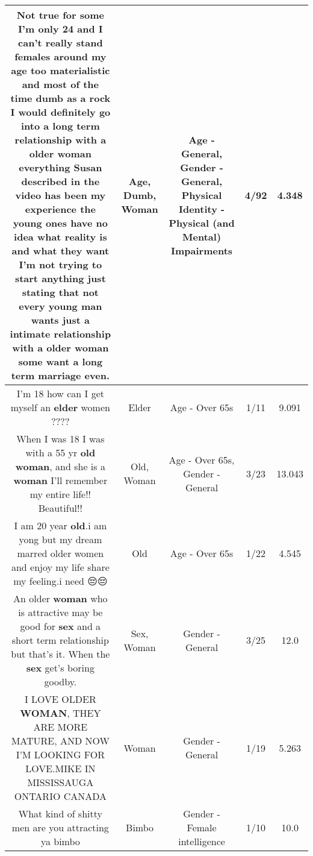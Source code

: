 \documentclass[11pt]{article}
\newlength\mylength
\begin{document}
\begin{center}
\begin{longtable}{|C{.65\mylength}|C{.30\mylength}|C{.12\mylength}|C{.12\mylength}|C{.12\mylength}|}
  \small Not true for some I'm only 24 and I can't really stand females around my \textbf{age} too materialistic and most of the time \textbf{dumb} as a rock I would definitely go into a long term relationship with a older \textbf{woman} everything Susan described in the video has been my experience the young ones have no idea what reality is and what they want  I'm not trying to start anything just stating that not every young man wants just a intimate relationship with a older \textbf{woman} some want a  long term marriage even.\normalsize   & Age, Dumb, Woman & Age - General, Gender - General, Physical Identity - Physical (and Mental) Impairments & 4/92 & 4.348 \\  \hline
  \small I'm 18 how can I get myself an \textbf{elder} women ????\normalsize   & Elder & Age - Over 65s & 1/11 & 9.091 \\  \hline
  \small When I was 18 I was with a 55 yr \textbf{old} \textbf{woman}, and she is a \textbf{woman} I'll remember my entire life!! Beautiful!!\normalsize   & Old, Woman & Age - Over 65s, Gender - General & 3/23 & 13.043 \\  \hline
  \small I am 20 year \textbf{old}.i am yong but my dream marred older women and enjoy my life share my feeling.i need 😔😔\normalsize   & Old & Age - Over 65s & 1/22 & 4.545 \\  \hline
  \small An older \textbf{woman} who is attractive may be good for \textbf{sex} and a short term relationship but that's it. When the \textbf{sex} get's boring goodby.\normalsize   & Sex, Woman & Gender - General & 3/25 & 12.0 \\  \hline
  \small I LOVE OLDER \textbf{WOMAN}, THEY ARE MORE MATURE, AND NOW I'M LOOKING FOR LOVE.MIKE IN MISSISSAUGA ONTARIO CANADA\normalsize   & Woman & Gender - General & 1/19 & 5.263 \\  \hline
  \small What kind of shitty men are you attracting ya bimbo\normalsize   & Bimbo & Gender - Female intelligence & 1/10 & 10.0 \\  \hline

\end{longtable}
\end{center}
\end{document}
